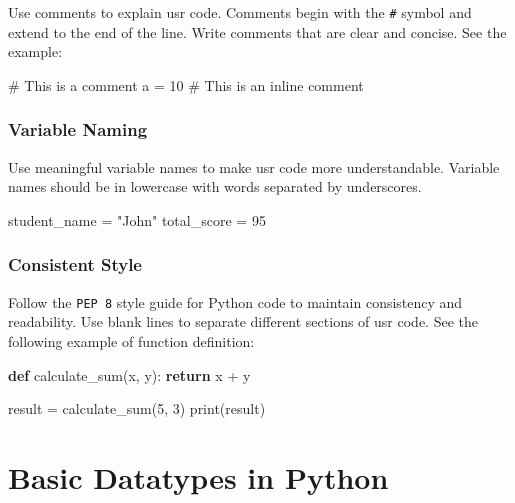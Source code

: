 \documentclass[
  letterpaper,
  DIV=11,
  numbers=noendperiod]{scrreprt}
\newenvironment{Shaded}{\begin{snugshade}}{\end{snugshade}}
\newcommand{\BuiltInTok}[1]{\textcolor[rgb]{0.00,0.23,0.31}{#1}}
\newcommand{\CommentTok}[1]{\textcolor[rgb]{0.37,0.37,0.37}{#1}}
\newcommand{\ControlFlowTok}[1]{\textcolor[rgb]{0.00,0.23,0.31}{\textbf{#1}}}
\newcommand{\DecValTok}[1]{\textcolor[rgb]{0.68,0.00,0.00}{#1}}
\newcommand{\KeywordTok}[1]{\textcolor[rgb]{0.00,0.23,0.31}{\textbf{#1}}}
\newcommand{\NormalTok}[1]{\textcolor[rgb]{0.00,0.23,0.31}{#1}}
\newcommand{\OperatorTok}[1]{\textcolor[rgb]{0.37,0.37,0.37}{#1}}
\newcommand{\StringTok}[1]{\textcolor[rgb]{0.13,0.47,0.30}{#1}}
\theoremstyle{plain}
\theoremstyle{definition}
\theoremstyle{remark}
\begin{document}
Use comments to explain usr code. Comments begin with the \texttt{\#}
symbol and extend to the end of the line. Write comments that are clear
and concise. See the example:

\begin{Shaded}
\begin{Highlighting}[]
\CommentTok{\# This is a comment}
\NormalTok{a }\OperatorTok{=} \DecValTok{10}  \CommentTok{\# This is an inline comment}
\end{Highlighting}
\end{Shaded}

\subsubsection{Variable Naming}\label{variable-naming}

Use meaningful variable names to make usr code more understandable.
Variable names should be in lowercase with words separated by
underscores.

\begin{Shaded}
\begin{Highlighting}[]
\NormalTok{student\_name }\OperatorTok{=} \StringTok{"John"}
\NormalTok{total\_score }\OperatorTok{=} \DecValTok{95}
\end{Highlighting}
\end{Shaded}

\subsubsection{Consistent Style}\label{consistent-style}

Follow the \texttt{PEP\ 8} style guide for Python code to maintain
consistency and readability. Use blank lines to separate different
sections of usr code. See the following example of function definition:

\begin{Shaded}
\begin{Highlighting}[]

\KeywordTok{def}\NormalTok{ calculate\_sum(x, y):}
    \ControlFlowTok{return}\NormalTok{ x }\OperatorTok{+}\NormalTok{ y}

\NormalTok{result }\OperatorTok{=}\NormalTok{ calculate\_sum(}\DecValTok{5}\NormalTok{, }\DecValTok{3}\NormalTok{)}
\BuiltInTok{print}\NormalTok{(result)}
\end{Highlighting}
\end{Shaded}

\section{Basic Datatypes in Python}\label{basic-datatypes-in-python}
\end{document}
